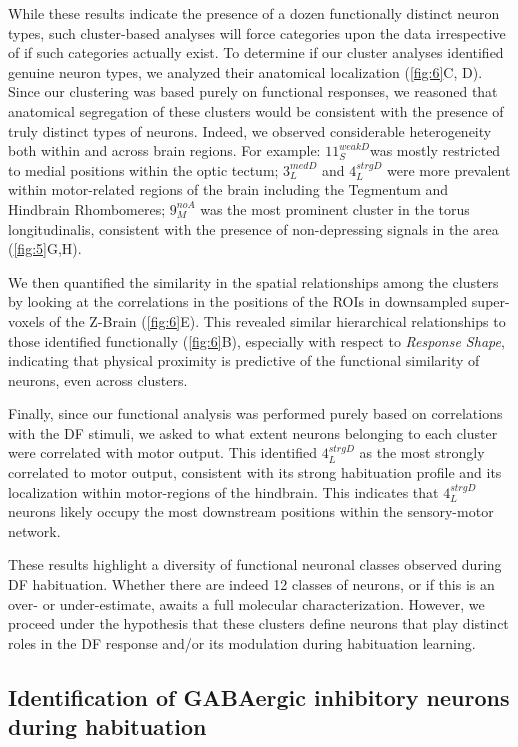 \documentclass[9pt,lineno]{RandlettLab_elife}
\begin{document}
\vspace{5mm}
While these results indicate the presence of a dozen functionally distinct neuron types, such cluster-based analyses will force categories upon the data irrespective of if such categories actually exist. To determine if our cluster analyses identified genuine neuron types, we analyzed their anatomical localization (\autoref{fig:6}C, D). Since our clustering was based purely on functional responses, we reasoned that anatomical segregation of these clusters would be consistent with the presence of truly distinct types of neurons. Indeed, we observed considerable heterogeneity both within and across brain regions. For example: 
$11_{S}^{weakD}$was mostly restricted to medial positions within the optic tectum; 
$3_{L}^{medD}$ and $4_{L}^{strgD}$ were more prevalent within motor-related regions of the brain including the Tegmentum and Hindbrain Rhombomeres; 
$9_{M}^{noA}$ was the most prominent cluster in the torus longitudinalis, consistent with the presence of non-depressing signals in the area (\autoref{fig:5}G,H). 

We then quantified the similarity in the spatial relationships among the clusters by looking at the correlations in the positions of the ROIs in downsampled super-voxels of the Z-Brain (\autoref{fig:6}E). This revealed similar hierarchical relationships to those identified functionally (\autoref{fig:6}B), especially with respect to \emph{Response Shape}, indicating that physical proximity is predictive of the functional similarity of neurons, even across clusters. 

Finally, since our functional analysis was performed purely based on correlations with the DF stimuli, we asked to what extent neurons belonging to each cluster were correlated with motor output. This identified $4_{L}^{strgD}$ as the most strongly correlated to motor output, consistent with its strong habituation profile and its localization within motor-regions of the hindbrain. This indicates that $4_{L}^{strgD}$ neurons likely occupy the most downstream positions within the sensory-motor network. 

These results highlight a diversity of functional neuronal classes observed during DF habituation. Whether there are indeed 12 classes of neurons, or if this is an over- or under-estimate, awaits a full molecular characterization. However, we proceed under the hypothesis that these clusters define neurons that play distinct roles in the DF response and/or its modulation during habituation learning. 
\pagebreak
\subsection{Identification of GABAergic inhibitory neurons during habituation}
\end{document}
